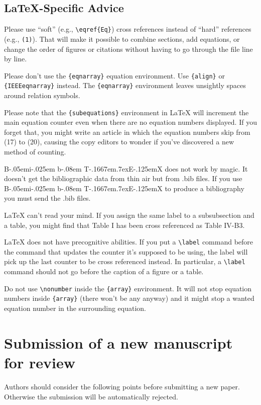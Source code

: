 \documentclass{ieeeojies}
\def\BibTeX{{\rm B\kern-.05em{\sc i\kern-.025em b}\kern-.08em
    T\kern-.1667em\lower.7ex\hbox{E}\kern-.125emX}}
\begin{document}
\subsection{\LaTeX-Specific Advice}

Please use ``soft'' (e.g., \verb|\eqref{Eq}|) cross references instead
of ``hard'' references (e.g., \verb|(1)|). That will make it possible
to combine sections, add equations, or change the order of figures or
citations without having to go through the file line by line.

Please don't use the \verb|{eqnarray}| equation environment. Use
\verb|{align}| or \verb|{IEEEeqnarray}| instead. The \verb|{eqnarray}|
environment leaves unsightly spaces around relation symbols.

Please note that the \verb|{subequations}| environment in {\LaTeX}
will increment the main equation counter even when there are no
equation numbers displayed. If you forget that, you might write an
article in which the equation numbers skip from (17) to (20), causing
the copy editors to wonder if you've discovered a new method of
counting.

{\BibTeX} does not work by magic. It doesn't get the bibliographic
data from thin air but from .bib files. If you use {\BibTeX} to produce a
bibliography you must send the .bib files. 

{\LaTeX} can't read your mind. If you assign the same label to a
subsubsection and a table, you might find that Table I has been cross
referenced as Table IV-B3. 

{\LaTeX} does not have precognitive abilities. If you put a
\verb|\label| command before the command that updates the counter it's
supposed to be using, the label will pick up the last counter to be
cross referenced instead. In particular, a \verb|\label| command
should not go before the caption of a figure or a table.

Do not use \verb|\nonumber| inside the \verb|{array}| environment. It
will not stop equation numbers inside \verb|{array}| (there won't be
any anyway) and it might stop a wanted equation number in the
surrounding equation.


\section{Submission of a new manuscript for review}
Authors should consider the following points before submitting a new paper. Otherwise the submission will be automatically rejected.
\end{document}
